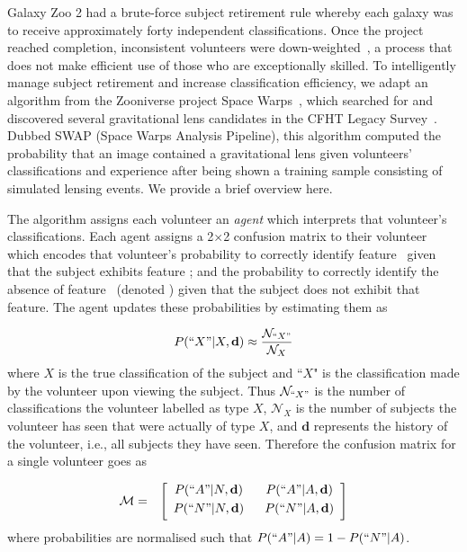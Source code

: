 Galaxy Zoo 2 had a brute-force subject retirement rule whereby each galaxy was to receive approximately forty independent classifications.  Once the project reached completion, inconsistent volunteers were down-weighted~\citep{Willett2013}, a process that does not make efficient use of those who are exceptionally skilled. To intelligently manage subject retirement and increase classification efficiency, we adapt an algorithm from the Zooniverse  project Space Warps~\citep{Marshall2016}, which searched for and discovered several gravitational lens candidates in the CFHT Legacy Survey~\citep{More2016}.  Dubbed SWAP (Space Warps Analysis Pipeline), this algorithm computed the probability that an image contained a gravitational lens given volunteers' classifications and experience after being shown a training sample consisting of simulated lensing events.  We provide a brief overview here.  

The algorithm assigns each volunteer an \textit{agent} which interprets that volunteer's classifications. Each agent assigns a 2$\times$2 confusion matrix to their volunteer which encodes that volunteer's probability to correctly identify feature \A~given that the subject exhibits feature \A; and the probability to correctly identify the absence of feature \A~(denoted \N) given that the subject does not exhibit that feature. The agent updates these probabilities by estimating them as 

\begin{equation}
P(``X" | X, \mathbf{d}) \approx \frac{\mathcal{N}_{``X"}}{\mathcal{N}_{X}}
\end{equation}
where $X$ is the true classification of the subject and ``$X$" is the  classification made by the volunteer upon viewing the subject. Thus $\mathcal{N}_{``X"}$ is the number of classifications the volunteer labelled as type $X$, $\mathcal{N}_X$ is the number of subjects the volunteer has seen that were actually of type $X$, and $\mathbf{d}$ represents the history of the volunteer, i.e., all subjects they have seen. Therefore the confusion matrix for a single volunteer goes as

\begin{eqnarray}
\mathcal{M} & = & \left[
	\begin{array}{cc}
		P(``A"|N, \mathbf{d}) ~~& P(``A" | A, \mathbf{d}) \\[0.3em]
		P(``N"|N, \mathbf{d})~~& P(``N"|A, \mathbf{d}) \\[0.3em]
	\end{array}\right]
\end{eqnarray}
where probabilities are normalised such that $P(``A"|A) = 1- P(``N" | A) $.

